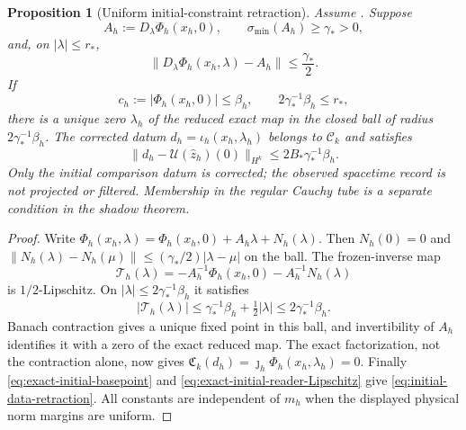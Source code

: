 \documentclass[11pt]{article}
\numberwithin{equation}{section}
\newtheorem{proposition}[proposition]{Proposition}
\theoremstyle{definition}
\theoremstyle{remark}
\newcommand{\norm}[1]{\lVert#1\rVert}
\begin{document}
\begin{proposition}[Uniform initial-constraint retraction]
\label{prop:initial-constraint-retraction}
Assume . Suppose
\begin{equation}
 A_h:=D_\lambda\Phi_h(x_h,0),\qquad
 \sigma_{\min}(A_h)\ge\gamma_*>0,
 \label{eq:constraint-linear-margin}
\end{equation}
and, on $|\lambda|\le r_*$,
\begin{equation}
 \norm{D_\lambda\Phi_h(x_h,\lambda)-A_h}\le\frac{\gamma_*}{2}.
 \label{eq:constraint-derivative-margin}
\end{equation}
If
\begin{equation}
 c_h:=|\Phi_h(x_h,0)|\le\beta_h,\qquad
 2\gamma_*^{-1}\beta_h\le r_*,
 \label{eq:constraint-small-residual}
\end{equation}
there is a unique zero $\lambda_h$ of the reduced exact map in the closed
ball of radius $2\gamma_*^{-1}\beta_h$. The corrected datum
$d_h=\iota_h(x_h,\lambda_h)$ belongs to $\mathcal C_k$ and satisfies
\begin{equation}
 \norm{d_h-\mathcal U(\widehat z_h)(0)}_{H^k}
       \le2B_*\gamma_*^{-1}\beta_h.
 \label{eq:initial-data-retraction}
\end{equation}
Only the initial comparison datum is corrected; the observed spacetime
record is not projected or filtered. Membership in the regular Cauchy tube
is a separate condition in the shadow theorem.
\end{proposition}
\begin{proof}
Write
$\Phi_h(x_h,\lambda)=\Phi_h(x_h,0)+A_h\lambda+N_h(\lambda)$.
Then $N_h(0)=0$ and
$\norm{N_h(\lambda)-N_h(\mu)}\le(\gamma_*/2)|\lambda-\mu|$ on the ball.
The frozen-inverse map
\[
 \mathcal T_h(\lambda)
 =-A_h^{-1}\Phi_h(x_h,0)-A_h^{-1}N_h(\lambda)
\]
is $1/2$-Lipschitz. On $|\lambda|\le2\gamma_*^{-1}\beta_h$ it satisfies
\[
 |\mathcal T_h(\lambda)|
 \le\gamma_*^{-1}\beta_h+\tfrac12|\lambda|
 \le2\gamma_*^{-1}\beta_h.
\]
Banach contraction gives a unique fixed point in this ball, and invertibility
of $A_h$ identifies it with a zero of the exact reduced map. The exact
factorization, not the contraction alone, now gives
$\mathfrak C_k(d_h)=\jmath_h\Phi_h(x_h,\lambda_h)=0$.
Finally \eqref{eq:exact-initial-basepoint} and
\eqref{eq:exact-initial-reader-Lipschitz} give
\eqref{eq:initial-data-retraction}. All constants are independent of $m_h$
when the displayed physical norm margins are uniform.
\end{proof}
\end{document}
